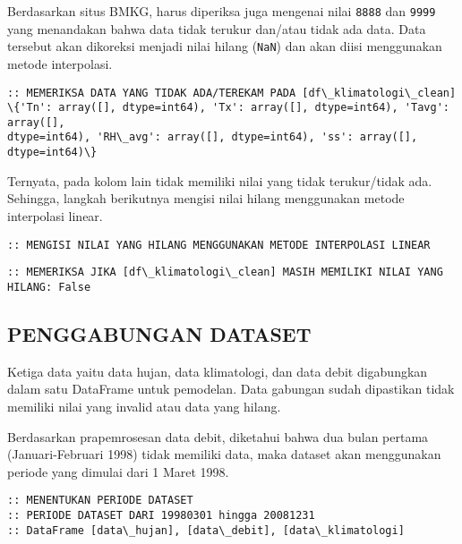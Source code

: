 \documentclass[11pt]{article}
\begin{document}
    Berdasarkan situs BMKG, harus diperiksa juga mengenai nilai
\texttt{8888} dan \texttt{9999} yang menandakan bahwa data tidak terukur
dan/atau tidak ada data. Data tersebut akan dikoreksi menjadi nilai
hilang (\texttt{NaN}) dan akan diisi menggunakan metode interpolasi.

    \begin{Verbatim}[commandchars=\\\{\}]
:: MEMERIKSA DATA YANG TIDAK ADA/TEREKAM PADA [df\_klimatologi\_clean]
\{'Tn': array([], dtype=int64), 'Tx': array([], dtype=int64), 'Tavg': array([],
dtype=int64), 'RH\_avg': array([], dtype=int64), 'ss': array([], dtype=int64)\}
    \end{Verbatim}

    Ternyata, pada kolom lain tidak memiliki nilai yang tidak terukur/tidak
ada. Sehingga, langkah berikutnya mengisi nilai hilang menggunakan
metode interpolasi linear.

    \begin{Verbatim}[commandchars=\\\{\}]
:: MENGISI NILAI YANG HILANG MENGGUNAKAN METODE INTERPOLASI LINEAR
    \end{Verbatim}

    \begin{Verbatim}[commandchars=\\\{\}]
:: MEMERIKSA JIKA [df\_klimatologi\_clean] MASIH MEMILIKI NILAI YANG HILANG: False
    \end{Verbatim}

    \hypertarget{penggabungan-dataset}{%
\subsection{PENGGABUNGAN DATASET}\label{penggabungan-dataset}}

Ketiga data yaitu data hujan, data klimatologi, dan data debit
digabungkan dalam satu DataFrame untuk pemodelan. Data gabungan sudah
dipastikan tidak memiliki nilai yang invalid atau data yang hilang.

Berdasarkan prapemrosesan data debit, diketahui bahwa dua bulan pertama
(Januari-Februari 1998) tidak memiliki data, maka dataset akan
menggunakan periode yang dimulai dari 1 Maret 1998.

    \begin{Verbatim}[commandchars=\\\{\}]
:: MENENTUKAN PERIODE DATASET
:: PERIODE DATASET DARI 19980301 hingga 20081231
:: DataFrame [data\_hujan], [data\_debit], [data\_klimatologi]
    \end{Verbatim}
\end{document}
